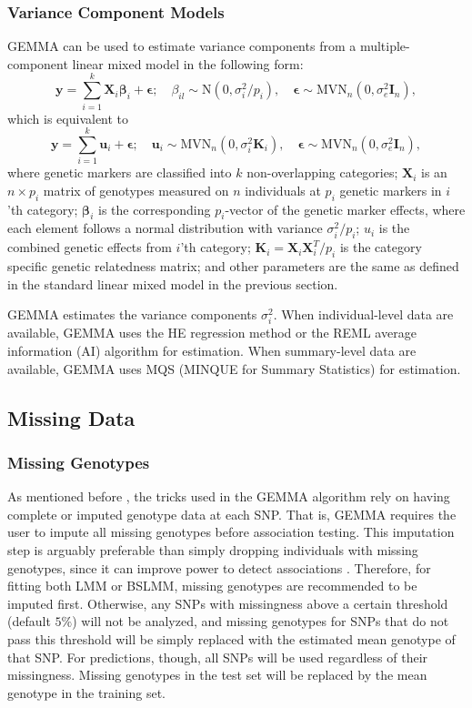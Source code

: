 \documentclass[11pt]{article}
\newcommand{\by}{\mathbf{y}}
\newcommand{\bu}{\mathbf{u}}
\newcommand{\bK}{\mathbf{K}}
\newcommand{\bX}{\mathbf{X}}
\newcommand{\bI}{\mathbf{I}}
\newcommand{\bepsilon}{\boldsymbol\epsilon}
\newcommand{\bbeta}{\boldsymbol\beta}
\begin{document}
\subsubsection{Variance Component Models}
GEMMA can be used to estimate variance components from a multiple-component linear mixed model in the following form:
%
\begin{equation*}
\by=\sum_{i=1}^k \bX_i\bbeta_i+\bepsilon;   \quad \beta_{il} \sim \mbox{N}(0, \sigma_i^2/p_i), \quad \bepsilon \sim \mbox{MVN}_n(0, \sigma_e^2 \bI_n),
\end{equation*}
%
which is equivalent to
\begin{equation*}
\by=\sum_{i=1}^k \bu_i +\bepsilon;   \quad \bu_i \sim \mbox{MVN}_n(0, \sigma_i^2 \bK_i), \quad \bepsilon \sim \mbox{MVN}_n(0, \sigma_e^2 \bI_n),
\end{equation*}
%
where genetic markers are classified into $k$ non-overlapping categories; $\bX_i$ is an $n \times p_i$ matrix of genotypes measured on $n$ individuals at $p_i$ genetic markers in $i$'th category; $\bbeta_i$ is the corresponding $p_i$-vector of the genetic marker effects, where each element follows a normal distribution with variance $\sigma_i^2/p_i$; $u_i$ is the combined genetic effects from $i$'th category; $\bK_i=\bX_i\bX_i^T/p_i$ is the category specific genetic relatedness matrix; and other parameters are the same as defined in the standard linear mixed model in the previous section.

GEMMA estimates the variance components $\sigma_i^2$. When individual-level data are available, GEMMA uses the HE regression method or the REML average information (AI) algorithm for estimation. When summary-level data are available, GEMMA uses MQS (MINQUE for Summary Statistics) for estimation. 


\subsection{Missing Data}
\subsubsection{Missing Genotypes}
As mentioned before \cite{Zhou:2012}, the tricks used in the GEMMA algorithm rely on having complete or imputed genotype data at each SNP. That is, GEMMA requires the user to impute all missing genotypes before association testing. This imputation step is arguably preferable than simply dropping individuals with missing genotypes, since it can improve power to detect associations \cite{Guan:2008}. Therefore, for fitting both LMM or BSLMM, missing genotypes are recommended to be imputed first. Otherwise, any SNPs with missingness above a certain threshold (default $5\%$) will not be analyzed, and missing genotypes for SNPs that do not pass this threshold will be simply replaced with the estimated mean genotype of that SNP. For predictions, though, all SNPs will be used regardless of their missingness. Missing genotypes in the test set will be replaced by the mean genotype in the training set.
\end{document}
